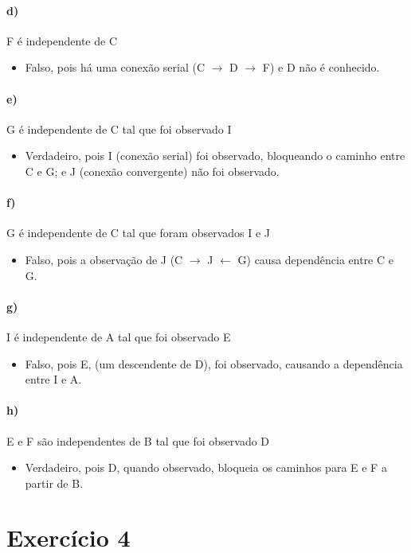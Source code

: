\documentclass{article}
\begin{document}
\paragraph{d)} F é independente de C
\begin{itemize}
	\item Falso, pois há uma conexão serial (C $\rightarrow$ D $\rightarrow$ F) e D não é conhecido.
\end{itemize}

\paragraph{e)} G é independente de C tal que foi observado I
\begin{itemize}
	\item Verdadeiro, pois I (conexão serial) foi observado, bloqueando o caminho entre C e G; e J (conexão convergente) não foi observado.
\end{itemize}

\paragraph{f)} G é independente de C tal que foram observados I e J
\begin{itemize}
	\item Falso, pois a observação de J (C $\rightarrow$ J $\leftarrow$ G) causa dependência entre C e G.
\end{itemize}

\paragraph{g)} I é independente de A tal que foi observado E
\begin{itemize}
	\item Falso, pois E, (um descendente de D), foi observado, causando a dependência entre I e A.
\end{itemize}

\paragraph{h)} E e F são independentes de B tal que foi observado D
\begin{itemize}
	\item Verdadeiro, pois D, quando observado, bloqueia os caminhos para E e F a partir de B.
\end{itemize}

\section{Exercício 4}
\end{document}

